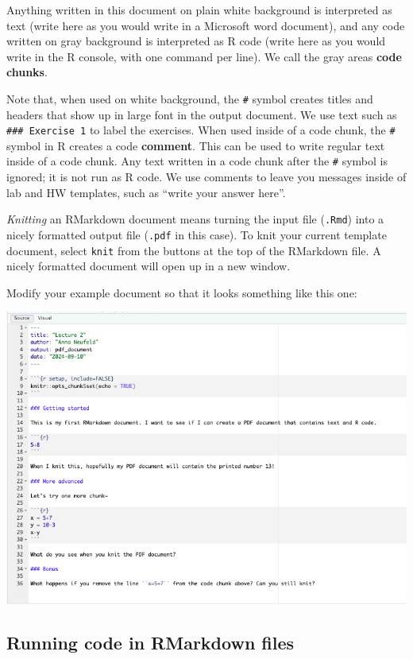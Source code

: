 \documentclass[
]{article}
\begin{document}
Anything written in this document on plain white background is
interpreted as text (write here as you would write in a Microsoft word
document), and any code written on gray background is interpreted as R
code (write here as you would write in the R console, with one command
per line). We call the gray areas \textbf{code chunks}.

Note that, when used on white background, the \texttt{\#} symbol creates
titles and headers that show up in large font in the output document. We
use text such as \texttt{\#\#\#\ Exercise\ 1} to label the exercises.
When used inside of a code chunk, the \texttt{\#} symbol in R creates a
code \textbf{comment}. This can be used to write regular text inside of
a code chunk. Any text written in a code chunk after the \texttt{\#}
symbol is ignored; it is not run as R code. We use comments to leave you
messages inside of lab and HW templates, such as ``write your answer
here''.

\emph{Knitting} an RMarkdown document means turning the input file
(\texttt{.Rmd}) into a nicely formatted output file (\texttt{.pdf} in
this case). To knit your current template document, select \texttt{knit}
from the buttons at the top of the RMarkdown file. A nicely formatted
document will open up in a new window.

Modify your example document so that it looks something like this one:

\includegraphics[width=9.375in,height=\textheight,keepaspectratio]{RMarkdown2.png}

\subsection{Running code in RMarkdown
files}\label{running-code-in-rmarkdown-files}
\end{document}
